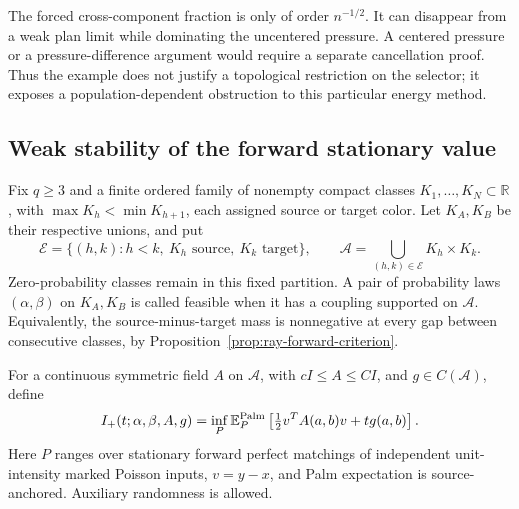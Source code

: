 \documentclass[11pt,reqno]{amsart}
\theoremstyle{definition}
\theoremstyle{remark}
\numberwithin{equation}{section}
\newcommand{\R}{\mathbb R}
\newcommand{\E}{\mathbb E}
\begin{document}
The forced cross-component fraction is only of order \(n^{-1/2}\).
It can disappear from a weak plan limit while dominating the
uncentered pressure. A centered pressure or a pressure-difference
argument would require a separate cancellation proof. Thus the example
does not justify a topological restriction on the selector; it exposes
a population-dependent obstruction to this particular energy method.

\subsection{Weak stability of the forward stationary value}
\label{subsec:forward-weak-stability}

Fix \(q\ge3\) and a finite ordered family of nonempty compact
classes \(K_1,\ldots,K_N\subset\R\), with
\(\max K_h<\min K_{h+1}\), each assigned source or target color.
Let \(K_A,K_B\) be their respective unions, and put
\[
 \mathcal E=\{(h,k):h<k,\ K_h\text{ source},\ K_k\text{ target}\},
 \qquad \mathcal A=\bigcup_{(h,k)\in\mathcal E}K_h\times K_k.
\]
Zero-probability classes remain in this fixed partition. A pair of
probability laws \((\alpha,\beta)\) on \(K_A,K_B\) is called
feasible when it has a coupling supported on \(\mathcal A\).
Equivalently, the source-minus-target mass is nonnegative at every
gap between consecutive classes, by
Proposition~\ref{prop:ray-forward-criterion}.

For a continuous symmetric field \(A\) on \(\mathcal A\), with
\(cI\le A\le CI\), and \(g\in C(\mathcal A)\), define
\begin{equation}
\label{eq:forward-weak-value}
 I_+(t;\alpha,\beta,A,g)
 =\inf_P\E_P^{\rm Palm}
       \left[\tfrac12 v^TA(a,b)v+t g(a,b)\right].
\end{equation}
Here \(P\) ranges over stationary forward perfect matchings of
independent unit-intensity marked Poisson inputs, \(v=y-x\), and
Palm expectation is source-anchored. Auxiliary randomness is allowed.
\end{document}
